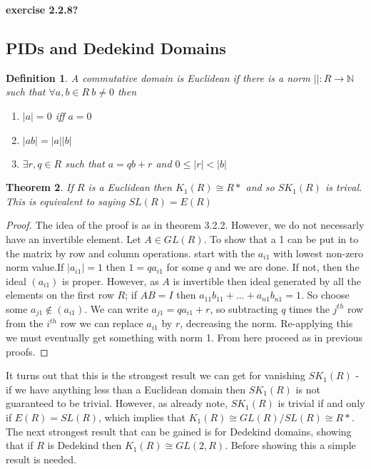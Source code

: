 \documentclass[a4paper,10pt]{article}
\newtheorem{thm}{Theorem}[subsection]
\newtheorem{defn}[thm]{Definition}
\begin{document}
\textbf{exercise 2.2.8?}

\subsection{PIDs and Dedekind Domains}

\begin{defn}
A commutative domain is Euclidean if there is a norm $||:R\rightarrow \mathbb{N}$ such that $\forall a,b\in R\ b\neq 0$ then
\begin{enumerate}
 \item $|a|=0$ iff $a=0$
 \item $|ab|=|a||b|$
 \item $\exists r,q\in R$ such that $a=qb+r$ and $0\leq |r|<|b|$
\end{enumerate}
\end{defn}


\begin{thm}
If $R$ is a Euclidean then $K_{1}(R)\cong R*$ and so $SK_{1}(R)$ is trival. This is equivalent to saying $SL(R)=E(R)$
\end{thm}
\begin{proof}
The idea of the proof is as in theorem 3.2.2. However, we do not necessarly have an invertible element. Let $A\in GL(R)$. To show that a 1 can be put in to the matrix by row and column operations. start with the $a_{i1}$ with lowest non-zero norm value.If $|a_{i1}|=1$ then $1=qa_{i1}$ for some $q$ and we are done.
\newline If not, then the ideal $(a_{i1})$ is proper. However, as $A$ is invertible then ideal generated by all the elements on the first row $R$; if $AB=I$ then $a_{11}b_{11}+\ldots +a_{n1}b_{n1}=1$. So choose some $a_{j1}\notin (a_{i1})$. We can write $a_{j1}=qa_{i1}+r$, so subtracting $q$ times the $j^{th}$ row from the $i^{th}$ row we can replace $a_{i1}$ by $r$, decreasing the norm. Re-applying this we must eventually get something with norm 1. From here proceed as in previous proofs.
\end{proof}

It turns out that this is the strongest result we can get for vanishing $SK_{1}(R)$ - if we have anything less than a Euclidean domain then $SK_{1}(R)$ is not guaranteed to be trivial. However, as already note, $SK_{1}(R)$ is trivial if and only if $E(R)=SL(R)$, which implies that $K_{1}(R)\cong GL(R)/SL(R)\cong R*$. The next strongest result that can be gained is for Dedekind domains, showing that if $R$ is Dedekind then $K_{1}(R)\cong GL(2,R)$. Before showing this a simple result is needed.
\end{document}
